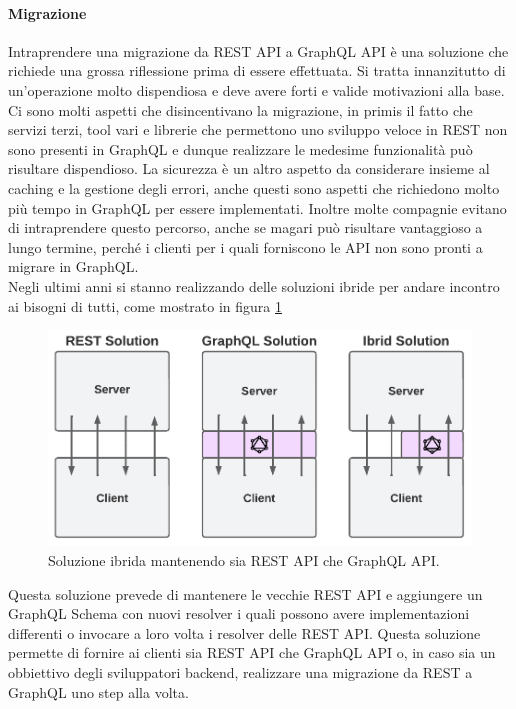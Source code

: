 \paragraph{Migrazione}
Intraprendere una migrazione da REST API a GraphQL API è una soluzione che richiede una grossa riflessione prima di essere effettuata. Si tratta innanzitutto di un'operazione molto dispendiosa e deve avere forti e valide motivazioni alla base. Ci sono molti aspetti che disincentivano la migrazione, in primis il fatto che servizi terzi, tool vari e librerie che permettono uno sviluppo veloce in REST non sono presenti in GraphQL e dunque realizzare le medesime funzionalità può risultare dispendioso. La sicurezza è un altro aspetto da considerare insieme al caching e la gestione degli errori, anche questi sono aspetti che richiedono molto più tempo in GraphQL per essere implementati. Inoltre molte compagnie evitano di intraprendere questo percorso, anche se magari può risultare vantaggioso a lungo termine, perché i clienti per i quali forniscono le API non sono pronti a migrare in GraphQL.\\
Negli ultimi anni si stanno realizzando delle soluzioni ibride per andare incontro ai bisogni di tutti, come mostrato in figura \ref{ibrid-solution}
\FloatBarrier
\begin{figure}[!ht]
\centering
\includegraphics[width=0.9\linewidth]{immagini/ibridSolution.pdf}
\caption{Soluzione ibrida mantenendo sia REST API che GraphQL API.}
\label{ibrid-solution}
\end{figure}
\FloatBarrier
Questa soluzione prevede di mantenere le vecchie REST API e aggiungere un GraphQL Schema con nuovi resolver i quali possono avere implementazioni differenti o invocare a loro volta i resolver delle REST API. Questa soluzione permette di fornire ai clienti sia REST API che GraphQL API o, in caso sia un obbiettivo degli sviluppatori backend, realizzare una migrazione da REST a GraphQL uno step alla volta.
\newpage
